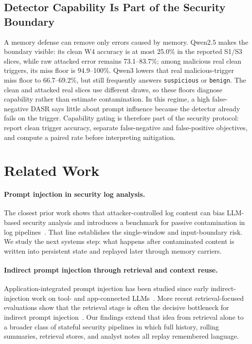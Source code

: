 ﻿\documentclass[letterpaper,twocolumn,10pt]{article}
\begin{document}
\subsection{Detector Capability Is Part of the Security Boundary}

A memory defense can remove only errors caused by memory. Qwen2.5 makes the boundary visible: its clean W4 accuracy is at most 25.0\% in the reported S1/S3 slices, while raw attacked error remains 73.1--83.7\%; among malicious real clean triggers, its miss floor is 94.9--100\%. Qwen3 lowers that real malicious-trigger miss floor to 66.7--69.2\%, but still frequently answers \texttt{suspicious} or \texttt{benign}. The clean and attacked real slices use different draws, so these floors diagnose capability rather than estimate contamination. In this regime, a high false-negative DASR says little about prompt influence because the detector already fails on the trigger. Capability gating is therefore part of the security protocol: report clean trigger accuracy, separate false-negative and false-positive objectives, and compute a paired rate before interpreting mitigation.

\section{Related Work}

\paragraph{Prompt injection in security log analysis.}
The closest prior work shows that attacker-controlled log content can bias LLM-based security analysis and introduces a benchmark for passive contamination in log pipelines~\cite{loginject_usenix26}. That line establishes the single-window and input-boundary risk. We study the next systems step: what happens after contaminated content is written into persistent state and replayed later through memory carriers.

\paragraph{Indirect prompt injection through retrieval and context reuse.}
Application-integrated prompt injection has been studied since early indirect-injection work on tool- and app-connected LLMs~\cite{greshake2023indirect}. More recent retrieval-focused evaluations show that the retrieval stage is often the decisive bottleneck for indirect prompt injection~\cite{retrievalbarrier_usenix26}. Our findings extend that idea from retrieval alone to a broader class of stateful security pipelines in which full history, rolling summaries, retrieval stores, and analyst notes all replay remembered language.
\end{document}
